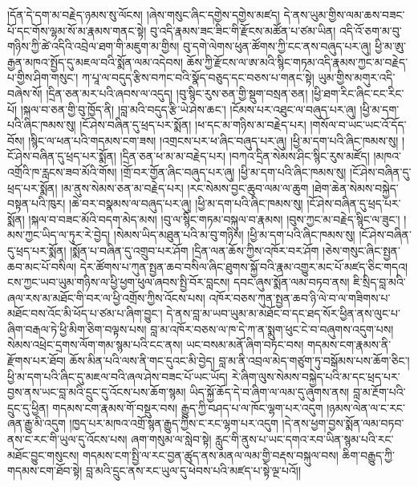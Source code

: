 \documentclass{article}
\begin{document}
།དོན་དེ་དག་མ་བརྗེད་ཉམས་སུ་ལོངས། །ཞེས་གསུང་ཞིང་དགྱེས་དགྱེས་མཛད། དེ་ནས་ཡུམ་གྱིས་ལམ་ཆས་བཟང་པོ་དང་གོས་ལྷམ་སོ་མ་རྣམས་གནང་སྟེ། བུ་འདི་རྣམས་ཟང་ཟིང་གི་རྫོངས་མཚོན་པ་ཙམ་ཡིན། འདི་འོ་ཅག་མ་བུ་གཉིས་ཀྱི་ཚེ་འདིའི་འབྲེལ་ཐག་གི་མཇུག་མ་གྱིས། བུ་དགེ་ལེགས་ཕུན་ཚོགས་ཀྱི་ངང་ནས་བཞུད་པར་ཞུ། ཕྱི་མ་ཨུ་རྒྱན་མཁའ་སྤྱོད་དུ་མཇལ་བའི་སྨོན་ལམ་འདེབས། ཆོས་ཀྱི་རྫོངས་ལ་ཨ་མའི་སྙིང་གཏམ་འདི་རྣམས་ཀྱང་མ་བརྗེད་པ་གྱིས་ཤིག་གསུང་། ཀ་པཱ་ལ་བདུད་རྩིས་བཀང་བའི་སྣོད་བཅུད་དང་བཅས་པ་གནང་སྟེ། ཡུམ་གྱིས་མགུར་འདི་བཞེས་སོ། །དྲིན་ཅན་མར་པའི་ཞབས་ལ་འདུད། །བུ་སྙིང་རུས་ཅན་གྱི་སྡུག་བསྲན་ཅན། །ཕྱི་ཐག་རིང་ཞིང་ངང་རིང་པོ། །སྐལ་བ་ཅན་གྱི་བུ་ཁྱོད་ནི། །བླ་མའི་བདུད་རྩི་ཡེ་ཤེས་ཆང་། །ངོམས་པར་འཐུང་ལ་བཞུད་པར་ཞུ། །ཕྱི་མ་དག་པའི་ཞིང་ཁམས་སུ། །ངོ་ཤེས་བཞིན་དུ་ཕྲད་པར་སྨོན། །ཕ་དང་མ་གཉིས་མ་བརྗེད་པར། །གསོལ་བ་ཡང་ཡང་འོ་དོད་བོས། །སྙིང་ལ་ཕན་པའི་གདམས་ངག་ཟས། །འགྲངས་པར་ཕ་ཞིང་བཞུད་པར་ཞུ། །ཕྱི་མ་དག་པའི་ཞིང་ཁམས་སུ། །ངོ་ཤེས་བཞིན་དུ་ཕྲད་པར་སྨོན། །དྲིན་ཅན་ཕ་མ་མ་བརྗེད་པར། །བཀའ་དྲིན་སེམས་ཤིང་སྙིང་རུས་མཛོད། །མཁའ་འགྲོའི་ཁ་རླངས་ཟབ་མོའི་གོས། །གྲོ་བར་གྱོན་ཞིང་བཞུད་པར་ཞུ། །ཕྱི་མ་དག་པའི་ཞིང་ཁམས་སུ། །ངོ་ཤེས་བཞིན་དུ་ཕྲད་པར་སྨོན། །མ་ནུས་སེམས་ཅན་མ་བརྗེད་པར། །རང་སེམས་བྱང་ཆུབ་ལམ་ལ་ཆུག །ཐེག་ཆེན་སེམས་བསྐྱེད་བསྟན་པའི་ཁུར། །ཆེ་བར་བསྣམས་ལ་བཞུད་པར་ཞུ། །ཕྱི་མ་དག་པའི་ཞིང་ཁམས་སུ། །ངོ་ཤེས་བཞིན་དུ་ཕྲད་པར་སྨོན། །སྐལ་བ་བཟང་མོའི་བདག་མེད་མས། །བུ་ལ་སྙིང་གཏམ་བསྐུལ་བ་རྣམས། །བུས་ཀྱང་མ་བརྗེད་སྙིང་ལ་ཟུང་། །མས་ཀྱང་ཡིད་ལ་ཏུར་རེ་བྱེད། །སེམས་ཡིད་མཐུན་པའི་མ་བུ་གཉིས། །ཕྱི་མ་དག་པའི་ཞིང་ཁམས་སུ། །ངོ་ཤེས་བཞིན་དུ་ཕྲད་པར་སྨོན། །སྨོན་པ་བཞིན་དུ་འགྲུབ་པར་ཤོག །དྲིན་ལན་ཆོས་ཀྱིས་འཁོར་བར་ཤོག །ཅེས་གསུང་ཞིང་སྤྱན་ཆབ་མང་པོ་བསིལ། དེར་ཚོགས་པ་ཀུན་སྤྱན་ཆབ་བསིལ་ཞིང་ཐུགས་སྐྱོ་བའི་རྣམ་འགྱུར་མང་པོ་མཛད་ཅིང་གདའ། ངས་ཀྱང་ཡབ་ཡུམ་གཉིས་ལ་ཕྱི་ཕྱག་ཕུལ་ཞབས་སྤྱི་བོར་བླངས། དབང་ཞུས་སྨོན་ལམ་བཏབ་ནས། ཇི་སྲིད་བླ་མའི་ཞལ་རས་མ་མཐོང་གི་བར་ལ་ཕྱི་འགྲོས་ཀྱིས་འོངས་པས། འཁོར་བཅས་ཀུན་སྤྱན་ཆབ་ཉི་ལེ་བ་ལ་གཟིགས་པ་མཐོང་བས་འོང་མི་ཕོད་པ་ཙམ་པ་ཞིག་བྱུང་། དེ་ནས་བླ་མ་ཡབ་ཡུམ་མ་མཐོང་བ་དང་ཐད་སོར་ཕྱིན་ནས་ལུང་པ་ཞིག་བརྒལ་ཏེ་ཕྱི་མིག་ཅིག་བལྟས་པས། བླ་མ་འཁོར་བཅས་ལ་ཁ་དེ་ཀ་ན་སྨུག་ཕུང་ངེ་བ་བཞུགས་འདུག་པས། སེམས་འཕྲེང་དྲགས་ལོག་གམ་སྙམ་པའི་ངང་ནས། ཡང་བསམ་མནོ་ཞིག་བཏང་བས། གདམས་ངག་རྣམས་ནི་རྫོགས་པར་ཐོབ། ཆོས་མིན་པའི་ལས་ནི་གང་དུའང་མི་བྱེད། བླ་མ་ནི་འབྲལ་མེད་གཙུག་ཏུ་བསྒོམས་པས་ཆོག་ཅིང་། ཕྱི་མ་དག་པའི་ཞིང་དུ་མཇལ་བའི་ཞལ་ཤེས་བཟང་པོ་ཡང་ཡོད། རེ་ཞིག་ལུས་སེམས་བསྐྱེད་པའི་མ་དང་ཕྲད་པར་བྱས་ནས་ཡང་བླ་མའི་དྲུང་དུ་འོངས་པས་ཆོག་སྙམ། ཡིད་སྐྱོ་ཆོད་དེ་བ་ཞིག་ལ་ལམ་དུ་ཞུགས་ནས། བླ་མ་རྔོག་པའི་དྲུང་དུ་ཕྱིན། གདམས་ངག་རྣམས་གོ་བསྡུར་བས། རྒྱུད་ཀྱི་བཤད་པ་ལ་ཁོང་ལྷག་པར་འདུག །ཉམས་ལེན་ལ་ང་རང་ཞན་རྒྱུ་མི་འདུག །ཁྱད་པར་མཁའ་འགྲོ་སྙན་རྒྱུད་ཀྱིས་ང་རང་ལྷག་པར་འདུག །དེ་ནས་ཕྱག་བྱས་སྨོན་ལམ་བཏབ་ནས་ང་རང་གི་ཡུལ་དུ་འོངས་པས། ཞག་གསུམ་ལ་སླེབ་སྟེ། རླུང་གི་ནུས་པ་ཡང་དགའ་རབ་ཡིན་སྙམ་པའི་རང་མཐོང་བྱུང་གསུངས། གདམས་ངག་སྤྱི་ལ་རང་བྱན་ཚུད་ནས་མནལ་ལམ་གྱི་བརྡས་བསྐུལ་བས། ཆིག་བརྒྱུད་ཀྱི་གདམས་ངག་ཐོབ་སྟེ། བླ་མའི་དྲུང་ནས་རང་ཡུལ་དུ་ཕེབས་པའི་མཛད་པ་སྟེ་ལྔ་པའོ།།
\end{document}
